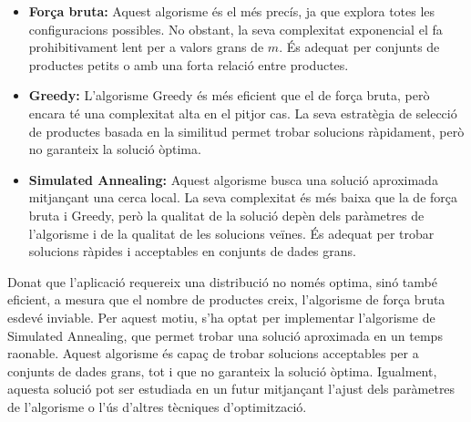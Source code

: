 \documentclass[a4paper,12pt]{report}
\begin{document}
\begin{itemize}
	\item \textbf{Força bruta:} Aquest algorisme és el més precís, ja que explora totes les configuracions possibles. No obstant, la seva complexitat exponencial el fa prohibitivament lent per a valors grans de \(m\). És adequat per conjunts de productes petits o amb una forta relació entre productes.
	\item \textbf{Greedy:} L'algorisme Greedy és més eficient que el de força bruta, però encara té una complexitat alta en el pitjor cas. La seva estratègia de selecció de productes basada en la similitud permet trobar solucions ràpidament, però no garanteix la solució òptima.
	\item \textbf{Simulated Annealing:} Aquest algorisme busca una solució aproximada mitjançant una cerca local. La seva complexitat és més baixa que la de força bruta i Greedy, però la qualitat de la solució depèn dels paràmetres de l'algorisme i de la qualitat de les solucions veïnes. És adequat per trobar solucions ràpides i acceptables en conjunts de dades grans.
\end{itemize}

Donat que l'aplicació requereix una distribució no només optima, sinó també eficient, a mesura que el nombre de productes creix, l'algorisme de força bruta esdevé inviable. Per aquest motiu, s'ha optat per implementar l'algorisme de Simulated Annealing, que permet trobar una solució aproximada en un temps raonable. Aquest algorisme és capaç de trobar solucions acceptables per a conjunts de dades grans, tot i que no garanteix la solució òptima. Igualment, aquesta solució pot ser estudiada en un futur mitjançant l'ajust dels paràmetres de l'algorisme o l'ús d'altres tècniques d'optimització.
\end{document}
